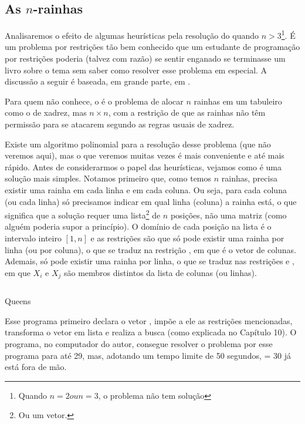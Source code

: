 \subsection{As $n$-rainhas}

Analisaremos o efeito de algumas heurísticas pela resolução do  quando $n > 3$\footnote{Quando $n = 2 ou n = 3$, o problema não tem solução}. É um
problema por restrições tão bem conhecido que um estudante de programação por
restrições poderia (talvez com razão) se sentir enganado se terminasse um livro sobre o tema sem saber
como resolver esse problema em especial. A discussão a seguir é baseada, em grande parte, em
\cite{krzysztof}.

Para quem não conhece, o  é o problema de alocar $n$ rainhas em um
tabuleiro como o de xadrez, mas $n\times n$, com a restrição de que as rainhas não têm permissão
para se atacarem segundo as regras usuais de xadrez.

Existe um algoritmo polinomial para a resolução desse problema (que não veremos aqui), mas o que
veremos muitas vezes é mais conveniente e até mais rápido. Antes de considerarmos o papel das
heurísticas, vejamos como é uma solução mais simples. Notamos primeiro que, como temos $n$ rainhas,
precisa existir uma rainha em cada linha e em cada coluna. Ou seja, para cada coluna (ou cada linha)
só precisamos indicar em qual linha (coluna) a rainha está, o que significa que a solução requer uma
lista\footnote{Ou um vetor.} de $n$ posições, não uma matriz (como alguém poderia supor a princípio). O domínio de cada
posição na lista é o intervalo inteiro $[1,n]$ e as restrições são que só pode existir uma rainha
por linha (ou por coluna), o que se traduz na restrição , em que
 é o vetor de colunas. Ademais, só pode existir uma rainha por linha, o que se traduz nas
restrições  e , em que $X_i$ e $X_j$ são membros distintos da lista de colunas (ou linhas).

    \begin{listing}[H]
    \inputminted{prolog}{../Exemplos/Cap11/prog1_queens.ecl}
    \caption{Queens}
    \end{listing}

Esse programa primeiro declara o vetor , impõe a ele as restrições mencionadas,
transforma o vetor em lista e realiza a busca (como explicada no Capítulo 10).%
O programa, no computador do autor, consegue resolver o problema por esse programa para  até 29,
mas, adotando um tempo limite de 50 segundos,  = 30 já está fora de mão.


